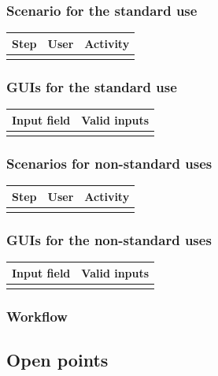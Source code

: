 \documentclass[12pt]{article}
\theoremstyle{definition}
\begin{document}
\subsubsection{Scenario for the standard use}

\begin{tabular}{|l|l|l|}
\hline
Step & User & Activity \\ \hline
 & & \\ \hline
\end{tabular}

\subsubsection{GUIs for the standard use}

\begin{tabular}{|l|l|}
\hline
Input field & Valid inputs \\ \hline
 &  \\ \hline
\end{tabular}

\subsubsection{Scenarios for non-standard uses}

\begin{tabular}{|l|l|l|}
\hline
Step & User & Activity \\ \hline
 & & \\ \hline
\end{tabular}

\subsubsection{GUIs for the non-standard uses}

\begin{tabular}{|l|l|}
\hline
Input field & Valid inputs \\ \hline
 &  \\ \hline
\end{tabular}

\subsubsection{Workflow}

\subsection{Open points}
\end{document}
